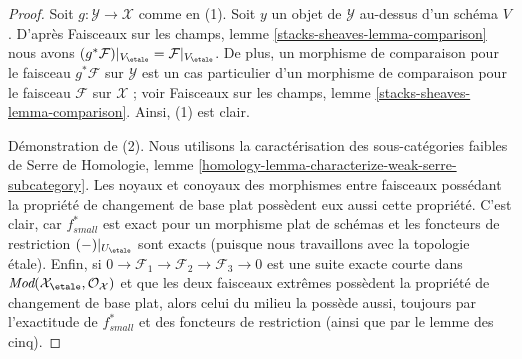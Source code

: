 \begin{proof}
Soit $g : \mathcal{Y} \to \mathcal{X}$ comme en (1).
Soit $y$ un objet de $\mathcal{Y}$ au-dessus d'un schéma $V$. D'après
Faisceaux sur les champs, lemme \ref{stacks-sheaves-lemma-comparison}
nous avons
$(g^*\mathcal{F})|_{V_\etale} = \mathcal{F}|_{V_\etale}$.
De plus, un morphisme de comparaison pour le faisceau $g^*\mathcal{F}$ sur $\mathcal{Y}$
est un cas particulier d'un morphisme de comparaison pour le faisceau $\mathcal{F}$ sur
$\mathcal{X}$ ; voir
Faisceaux sur les champs, lemme \ref{stacks-sheaves-lemma-comparison}.
Ainsi, (1) est clair.

\medskip\noindent
Démonstration de (2). Nous utilisons la caractérisation des sous-catégories faibles de Serre de
Homologie, lemme \ref{homology-lemma-characterize-weak-serre-subcategory}.
Les noyaux et conoyaux des
morphismes entre faisceaux possédant la propriété de changement de base plat
possèdent eux aussi cette propriété. C'est clair, car
$f_{small}^*$ est exact pour un morphisme plat de schémas et les
foncteurs de restriction $(-)|_{U_\etale}$ sont exacts (puisque nous
travaillons avec la topologie étale). Enfin, si
$0 \to \mathcal{F}_1 \to \mathcal{F}_2 \to \mathcal{F}_3 \to 0$
est une suite exacte courte dans
$\textit{Mod}(\mathcal{X}_\etale, \mathcal{O}_\mathcal{X})$
et que les deux faisceaux extrêmes possèdent la propriété de changement de base plat, alors
celui du milieu la possède aussi, toujours par l'exactitude de
$f_{small}^*$ et des foncteurs de restriction (ainsi que par le lemme des cinq).


\end{proof}
